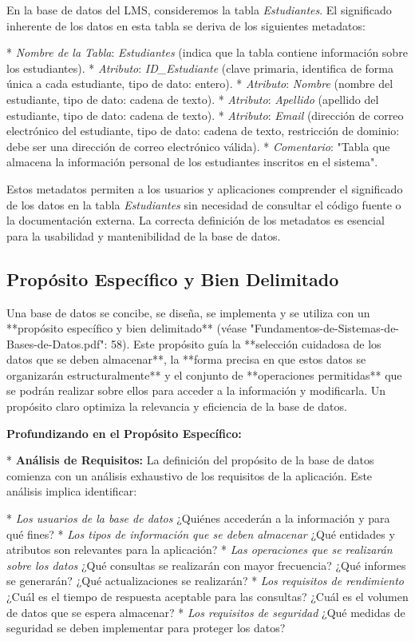 En la base de datos del LMS, consideremos la tabla \textit{Estudiantes}.  El significado inherente de los datos en esta tabla se deriva de los siguientes metadatos:

*   \textit{Nombre de la Tabla}: \textit{Estudiantes} (indica que la tabla contiene información sobre los estudiantes).
*   \textit{Atributo}: \textit{ID\_Estudiante} (clave primaria, identifica de forma única a cada estudiante, tipo de dato: entero).
*   \textit{Atributo}: \textit{Nombre} (nombre del estudiante, tipo de dato: cadena de texto).
*   \textit{Atributo}: \textit{Apellido} (apellido del estudiante, tipo de dato: cadena de texto).
*   \textit{Atributo}: \textit{Email} (dirección de correo electrónico del estudiante, tipo de dato: cadena de texto, restricción de dominio: debe ser una dirección de correo electrónico válida).
*   \textit{Comentario}: "Tabla que almacena la información personal de los estudiantes inscritos en el sistema".

Estos metadatos permiten a los usuarios y aplicaciones comprender el significado de los datos en la tabla \textit{Estudiantes} sin necesidad de consultar el código fuente o la documentación externa.  La correcta definición de los metadatos es esencial para la usabilidad y mantenibilidad de la base de datos.

\subsection{Propósito Específico y Bien Delimitado}

Una base de datos se concibe, se diseña, se implementa y se utiliza con un **propósito específico y bien delimitado** (véase "Fundamentos-de-Sistemas-de-Bases-de-Datos.pdf": 58). Este propósito guía la **selección cuidadosa de los datos que se deben almacenar**, la **forma precisa en que estos datos se organizarán estructuralmente** y el conjunto de **operaciones permitidas** que se podrán realizar sobre ellos para acceder a la información y modificarla.  Un propósito claro optimiza la relevancia y eficiencia de la base de datos.

\textbf{Profundizando en el Propósito Específico:}

*   \textbf{Análisis de Requisitos:} La definición del propósito de la base de datos comienza con un análisis exhaustivo de los requisitos de la aplicación. Este análisis implica identificar:

    *   \textit{Los usuarios de la base de datos}  ¿Quiénes accederán a la información y para qué fines?
    *   \textit{Los tipos de información que se deben almacenar}  ¿Qué entidades y atributos son relevantes para la aplicación?
    *   \textit{Las operaciones que se realizarán sobre los datos} ¿Qué consultas se realizarán con mayor frecuencia? ¿Qué informes se generarán? ¿Qué actualizaciones se realizarán?
    *   \textit{Los requisitos de rendimiento} ¿Cuál es el tiempo de respuesta aceptable para las consultas? ¿Cuál es el volumen de datos que se espera almacenar?
    *   \textit{Los requisitos de seguridad}  ¿Qué medidas de seguridad se deben implementar para proteger los datos?

